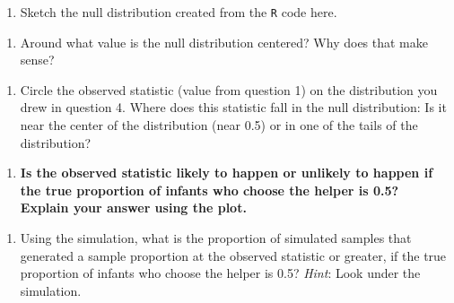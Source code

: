 \documentclass[
]{report}
\providecommand{\tightlist}{%
  \setlength{\itemsep}{0pt}\setlength{\parskip}{0pt}}
\begin{document}
\begin{enumerate}
\def\labelenumi{\arabic{enumi}.}
\setcounter{enumi}{3}
\tightlist
\item
  Sketch the null distribution created from the \texttt{R} code here.
\end{enumerate}

\vspace{1.8in}

\begin{enumerate}
\def\labelenumi{\arabic{enumi}.}
\setcounter{enumi}{4}
\tightlist
\item
  Around what value is the null distribution centered? Why does that make sense?
\end{enumerate}

\vspace{1in}

\begin{enumerate}
\def\labelenumi{\arabic{enumi}.}
\setcounter{enumi}{5}
\tightlist
\item
  Circle the observed statistic (value from question 1) on the distribution you drew in question 4. Where does this statistic fall in the null distribution: Is it near the center of the distribution (near 0.5) or in one of the tails of the distribution?
\end{enumerate}

\vspace{1in}

\begin{enumerate}
\def\labelenumi{\arabic{enumi}.}
\setcounter{enumi}{6}
\tightlist
\item
  \textbf{Is the observed statistic likely to happen or unlikely to happen if the true proportion of infants who choose the helper is 0.5? Explain your answer using the plot.}
\end{enumerate}

\vspace{1in}

\begin{enumerate}
\def\labelenumi{\arabic{enumi}.}
\setcounter{enumi}{7}
\tightlist
\item
  Using the simulation, what is the proportion of simulated samples that generated a sample proportion at the observed statistic or greater, if the true proportion of infants who choose the helper is 0.5? \emph{Hint}: Look under the simulation.
\end{enumerate}

\vspace{1in}
\end{document}
